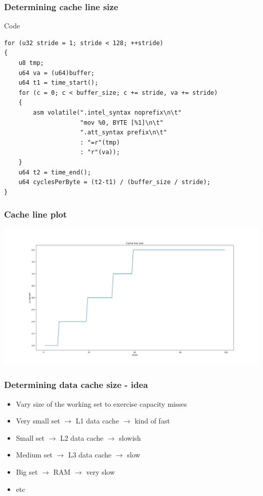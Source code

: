 \documentclass{beamer}
\begin{document}
\begin{frame}[fragile]
\frametitle{Determining cache line size}
\begin{block}{Code}
\begin{lstlisting}[style=code]
for (u32 stride = 1; stride < 128; ++stride)
{
    u8 tmp;
    u64 va = (u64)buffer;
    u64 t1 = time_start();
    for (c = 0; c < buffer_size; c += stride, va += stride)
    {
        asm volatile(".intel_syntax noprefix\n\t"
                     "mov %0, BYTE [%1]\n\t"
                     ".att_syntax prefix\n\t"
                     : "=r"(tmp)
                     : "r"(va));
    }
    u64 t2 = time_end();
    u64 cyclesPerByte = (t2-t1) / (buffer_size / stride);
}
\end{lstlisting}
\end{block}
\end{frame}

\begin{frame}
\frametitle{Cache line plot}
\centerline{\includegraphics[scale=.3]{img/cache_line_size.png}}
\end{frame}

\begin{frame}
\frametitle{Determining data cache size - idea}
\begin{itemize}
\item Vary size of the working set to exercise capacity misses
\item Very small set $\rightarrow$ L1 data cache $\rightarrow$ kind of fast
\item Small set $\rightarrow$ L2 data cache $\rightarrow$ slowish
\item Medium set $\rightarrow$ L3 data cache $\rightarrow$ slow
\item Big set $\rightarrow$ RAM $\rightarrow$ very slow
\item etc
\end{itemize}
\end{frame}
\end{document}
